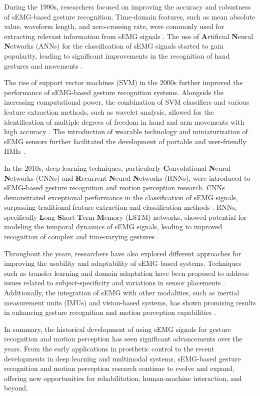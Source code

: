 \documentclass[12pt, a4paper]{article}
\begin{document}
During the 1990s, researchers focused on improving the accuracy and robustness of sEMG-based gesture recognition. Time-domain features, such as mean absolute value, waveform length, and zero-crossing rate, were commonly used for extracting relevant information from sEMG signals \cite{zecca2002control}. The use of \textbf{A}rtificial \textbf{N}eural \textbf{N}etworks (ANNs) for the classification of sEMG signals started to gain popularity, leading to significant improvements in the recognition of hand gestures and movements \cite{hargrove2008training}.

The rise of support vector machines (SVM) in the 2000s further improved the performance of sEMG-based gesture recognition systems. Alongside the increasing computational power, the combination of SVM classifiers and various feature extraction methods, such as wavelet analysis, allowed for the identification of multiple degrees of freedom in hand and arm movements with high accuracy \cite{englehart1999classification}. The introduction of wearable technology and miniaturization of sEMG sensors further facilitated the development of portable and user-friendly HMIs \cite{castellini2009surface}.

In the 2010s, deep learning techniques, particularly \textbf{C}onvolutional \textbf{N}eural \textbf{N}etworks (CNNs) and \textbf{R}ecurrent \textbf{N}eural \textbf{N}etworks (RNNs), were introduced to sEMG-based gesture recognition and motion perception research. CNNs demonstrated exceptional performance in the classification of sEMG signals, surpassing traditional feature extraction and classification methods \cite{diener2015direct}. RNNs, specifically \textbf{L}ong \textbf{S}hort-\textbf{T}erm \textbf{M}emory (LSTM) networks, showed potential for modeling the temporal dynamics of sEMG signals, leading to improved recognition of complex and time-varying gestures \cite{geng2016gesture}.

Throughout the years, researchers have also explored different approaches for improving the usability and adaptability of sEMG-based systems. Techniques such as transfer learning and domain adaptation have been proposed to address issues related to subject-specificity and variations in sensor placements \cite{du2017surface}. Additionally, the integration of sEMG with other modalities, such as inertial measurement units (IMUs) and vision-based systems, has shown promising results in enhancing gesture recognition and motion perception capabilities \cite{radmand2016high}.

In summary, the historical development of using sEMG signals for gesture recognition and motion perception has seen significant advancements over the years. From the early applications in prosthetic control to the recent developments in deep learning and multimodal systems, sEMG-based gesture recognition and motion perception research continue to evolve and expand, offering new opportunities for rehabilitation, human-machine interaction, and beyond.
\end{document}
